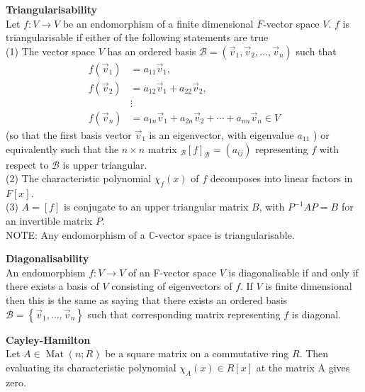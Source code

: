 \documentclass[a4paper, 10pt]{article}
\begin{document}
\begin{multicols*}{3}
\textbf{Triangularisability}\\
Let $f: V \rightarrow V$ be an endomorphism of a finite dimensional $F$-vector space $V$. $f$ is triangularisable if either of the following statements are true\\
(1) The vector space $V$ has an ordered basis $\mathcal{B}=\left(\vec{v}_1, \vec{v}_2, \ldots, \vec{v}_n\right)$ such that
$$
\begin{aligned}
f\left(\vec{v}_1\right) & =a_{11} \vec{v}_1, \\
f\left(\vec{v}_2\right) & =a_{12} \vec{v}_1+a_{22} \vec{v}_2, \\
& \vdots \\
f\left(\vec{v}_n\right) & =a_{1 n} \vec{v}_1+a_{2 n} \vec{v}_2+\cdots+a_{n n} \vec{v}_n \in V
\end{aligned}
$$
(so that the first basis vector $\vec{v}_1$ is an eigenvector, with eigenvalue $a_{11}$ ) or equivalently such that the $n \times n$ matrix $_{\mathcal{B}}[f]_{\mathcal{B}}=\left(a_{i j}\right)$ representing $f$ with respect to $\mathcal{B}$ is upper triangular.\\
(2) The characteristic polynomial $\chi_f(x)$ of $f$ decomposes into linear factors in $F[x]$.\\
(3) $A= [f]$ is conjugate to an upper triangular matrix $B$, with $P^{-1} A P=B$ for an invertible matrix $P$.\\
NOTE: Any endomorphism of a $\mathbb{C}$-vector space is triangularisable.

\textbf{Diagonalisability}\\
An endomorphism $f: V \rightarrow V$ of an F-vector space $V$ is diagonalisable if and only if there exists a basis of $V$ consisting of eigenvectors of $f$. If $V$ is finite dimensional then this is the same as saying that there exists an ordered basis $\mathcal{B}=\left\{\vec{v}_1, \ldots, \vec{v}_n\right\}$ such that corresponding matrix representing $f$ is diagonal.

\textbf{Cayley-Hamilton}\\
Let $A \in \operatorname{Mat}(n ; R)$ be a square matrix on a commutative ring $R$. Then evaluating its characteristic polynomial $\chi_A(x) \in R[x]$ at the matrix A gives zero.


\end{multicols*}
\end{document}
